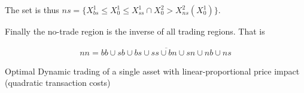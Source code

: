 \documentclass[10pt]{article}
\newenvironment{exercise}[2][Exercise]{\begin{trivlist}
  \item[\hskip \labelsep {\bfseries #1}\hskip \labelsep {\bfseries #2.}]}{\end{trivlist}}
\begin{document}
The set is thus $ns = \{ X_{bs}^1 \leq X_0^1 \leq X_{ss}^1 \cap X_0^2 > X_{ns}^2(X_0^1) \}$.

\bigbreak

Finally the no-trade region is the inverse of all trading regions. That is 

\begin{align*}
	nn = {\overline{bb \cup sb \cup bs \cup ss \cup bn \cup sn \cup nb \cup ns}}
\end{align*}

\newpage

\begin{exercise}{3}{Optimal Dynamic trading of a single asset with linear-proportional price impact (quadratic transaction costs)}
\end{exercise}
   
\end{document}
